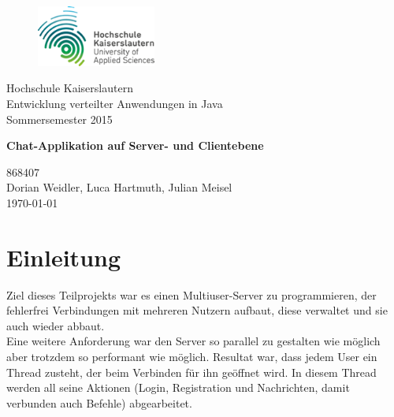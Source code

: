 \documentclass[a4paper,12pt]{scrartcl}
\begin{document}
\begin{titlepage}
\begin{small}
\vfill {
\begin{figure}
 \vspace{-16pt}
 \centering 
 \includegraphics[width=0.35\textwidth]{Bilder/hs_logo.png}
 \vspace{-10pt}
\end{figure}
Hochschule Kaiserslautern\\ 
Entwicklung verteilter Anwendungen in Java\\ 
Sommersemester 2015}
\end{small}


\begin{center}
\begin{Large}
\vfill { \textsf{\textbf{
Chat-Applikation auf Server- und Clientebene
}}}
\end{Large}
\end{center}

\begin{small}
\vfill 868407 \\ Dorian Weidler, Luca Hartmuth, Julian Meisel \\
\today
\end{small}

\end{titlepage}


\tableofcontents
\thispagestyle{empty}

\clearpage

\onehalfspacing

\pagestyle{plain}


\section{Einleitung}
Ziel dieses Teilprojekts war es einen Multiuser-Server zu programmieren, der fehlerfrei Verbindungen mit mehreren Nutzern aufbaut, diese verwaltet und sie auch wieder abbaut.\\

Eine weitere Anforderung war den Server so parallel zu gestalten wie möglich aber trotzdem so performant wie möglich. Resultat war, dass jedem User ein Thread zusteht, der beim Verbinden für ihn geöffnet wird. In diesem Thread werden all seine Aktionen (Login, Registration und Nachrichten, damit verbunden auch Befehle) abgearbeitet.\\
\end{document}
